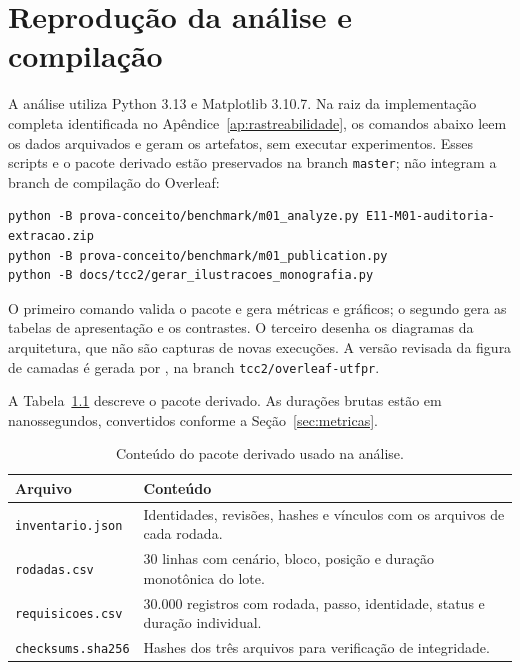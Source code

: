\chapter{Reprodução da análise e compilação}
\label{ap:reproducao}

A análise utiliza Python 3.13 e Matplotlib 3.10.7. Na raiz da implementação completa identificada no Apêndice~\ref{ap:rastreabilidade}, os comandos abaixo leem os dados arquivados e geram os artefatos, sem executar experimentos. Esses scripts e o pacote derivado estão preservados na branch \texttt{master}; não integram a branch de compilação do Overleaf:

\begin{lstlisting}[style=tcccode,xleftmargin=3.4em,xrightmargin=0.4em,framexleftmargin=0pt,framexrightmargin=0pt,framesep=3pt,numbersep=9pt]
python -B prova-conceito/benchmark/m01_analyze.py E11-M01-auditoria-extracao.zip
python -B prova-conceito/benchmark/m01_publication.py
python -B docs/tcc2/gerar_ilustracoes_monografia.py
\end{lstlisting}

O primeiro comando valida o pacote e gera métricas e gráficos; o segundo gera as tabelas de apresentação e os contrastes. O terceiro desenha os diagramas da arquitetura, que não são capturas de novas execuções. A versão revisada da figura de camadas é gerada por , na branch \texttt{tcc2/overleaf-utfpr}.

A Tabela~\ref{tab:arquivos-pacote} descreve o pacote derivado. As durações brutas estão em nanossegundos, convertidos conforme a Seção~\ref{sec:metricas}.

\begin{table}[htbp]
\centering\small
\caption{Conteúdo do pacote derivado usado na análise.}
\label{tab:arquivos-pacote}
\begin{tabularx}{\linewidth}{@{}p{4cm}X@{}}
\toprule
Arquivo & Conteúdo \\
\midrule
\texttt{inventario.json} & Identidades, revisões, hashes e vínculos com os arquivos de cada rodada. \\
\texttt{rodadas.csv} & 30 linhas com cenário, bloco, posição e duração monotônica do lote. \\
\texttt{requisicoes.csv} & 30.000 registros com rodada, passo, identidade, status e duração individual. \\
\texttt{checksums.sha256} & Hashes dos três arquivos para verificação de integridade. \\
\bottomrule
\end{tabularx}
\fonte{}
\end{table}

